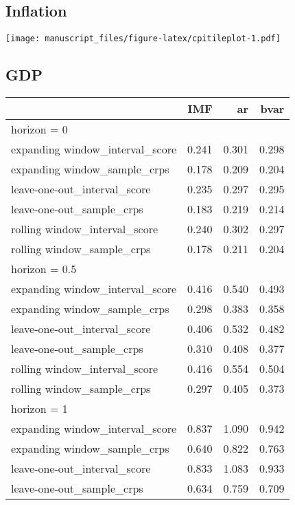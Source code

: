 \documentclass[
]{article}
\begin{document}
\hypertarget{inflation-2}{%
\subsection{Inflation}\label{inflation-2}}

\texttt{[image: manuscript\_files/figure-latex/cpitileplot-1.pdf]}

\hypertarget{gdp-2}{%
\subsection{GDP}\label{gdp-2}}

\begin{longtable}{l|rrr}
\toprule
\multicolumn{1}{l}{} & IMF & ar & bvar \\ 
\midrule
\multicolumn{4}{l}{horizon = 0} \\ 
\midrule
expanding window\_interval\_score & 0.241 & 0.301 & 0.298 \\ 
expanding window\_sample\_crps & 0.178 & 0.209 & 0.204 \\ 
leave-one-out\_interval\_score & 0.235 & 0.297 & 0.295 \\ 
leave-one-out\_sample\_crps & 0.183 & 0.219 & 0.214 \\ 
rolling window\_interval\_score & 0.240 & 0.302 & 0.297 \\ 
rolling window\_sample\_crps & 0.178 & 0.211 & 0.204 \\ 
\midrule
\multicolumn{4}{l}{horizon = 0.5} \\ 
\midrule
expanding window\_interval\_score & 0.416 & 0.540 & 0.493 \\ 
expanding window\_sample\_crps & 0.298 & 0.383 & 0.358 \\ 
leave-one-out\_interval\_score & 0.406 & 0.532 & 0.482 \\ 
leave-one-out\_sample\_crps & 0.310 & 0.408 & 0.377 \\ 
rolling window\_interval\_score & 0.416 & 0.554 & 0.504 \\ 
rolling window\_sample\_crps & 0.297 & 0.405 & 0.373 \\ 
\midrule
\multicolumn{4}{l}{horizon = 1} \\ 
\midrule
expanding window\_interval\_score & 0.837 & 1.090 & 0.942 \\ 
expanding window\_sample\_crps & 0.640 & 0.822 & 0.763 \\ 
leave-one-out\_interval\_score & 0.833 & 1.083 & 0.933 \\ 
leave-one-out\_sample\_crps & 0.634 & 0.759 & 0.709 \\ 

\end{longtable}
\end{document}
